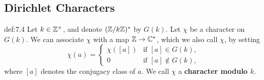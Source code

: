 \subsection{Dirichlet Characters}\label{subsec:7.3}

\vspace{2ex}
\begin{defn}{def:7.4}
    Let $k \in \mathbb{Z}^+$, and denote $(\mathbb{Z}/k\mathbb{Z})^*$ by $G(k)$. Let $\chi$ be a character 
    on $G(k)$. We can associate $\chi$ with a map $\mathbb{Z} \to \mathbb{C}^*$, which we also 
    call $\chi$, by setting 
    \[ \chi(a) = \begin{cases} 
        \chi([a]) & \text{if } [a] \in G(k), \\ 
        0 & \text{if } [a] \notin G(k), 
    \end{cases} \] 
    where $[a]$ denotes the conjugacy class of $a$. We call $\chi$ a 
    {\bf character modulo $k$}. 
\end{defn}

